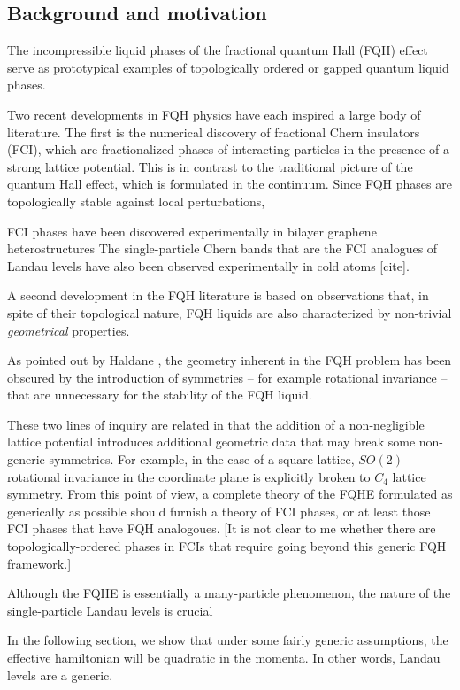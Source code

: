 \documentclass[aps,prb,twocolumn,letterpaper,twoside,nobalancelastpage,groupedaddress,amsmath,amssymb,floatfix,citeautoscript]{revtex4-1}
\begin{document}
\subsection{Background and motivation}
The incompressible liquid phases of the fractional quantum Hall (FQH) effect serve as prototypical examples of topologically ordered or gapped quantum liquid phases.

Two recent developments in FQH physics have each inspired a large body of literature. The first is the numerical discovery of fractional Chern insulators (FCI), which are fractionalized phases of interacting particles in the presence of a strong lattice potential. This is in contrast to the traditional picture of the quantum Hall effect, which is formulated in the continuum. Since FQH phases are topologically stable against local perturbations,

FCI phases have been discovered experimentally in bilayer graphene heterostructures \cite{Spantoneaan8458} The single-particle Chern bands that are the FCI analogues of Landau levels have also been observed experimentally in cold atoms [cite].

A second development in the FQH literature is based on observations that, in spite of their topological nature, FQH liquids are also characterized by non-trivial \textit{geometrical} properties.

As pointed out by Haldane \cite{Haldane2011}, the geometry inherent in the FQH problem has been obscured by the introduction of symmetries -- for example rotational invariance -- that are unnecessary for the stability of the FQH liquid. 

These two lines of inquiry are related in that the addition of a non-negligible lattice potential introduces additional geometric data that may break some non-generic symmetries. For example, in the case of a square lattice, $SO(2)$ rotational invariance in the coordinate plane is explicitly broken to $C_4$ lattice symmetry. From this point of view, a complete theory of the FQHE formulated as generically as possible should furnish a theory of FCI phases, or at least those FCI phases that have FQH analogoues. [It is not clear to me whether there are topologically-ordered phases in FCIs that require going beyond this generic FQH framework.]


Although the FQHE is essentially a many-particle phenomenon, the nature of the single-particle Landau levels is crucial 


In the following section, we show that under some fairly generic assumptions, the effective hamiltonian will be quadratic in the momenta. In other words, Landau levels are a generic.
\end{document}
